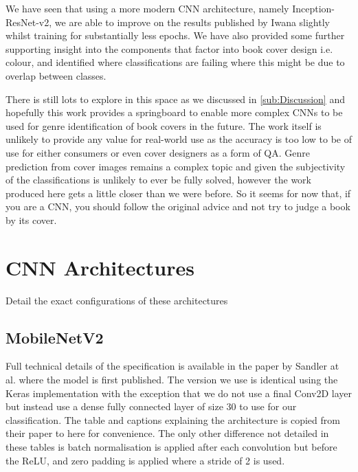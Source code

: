 \documentclass[12pt]{article}
\numberwithin{equation}{section}
\numberwithin{figure}{section}
\begin{document}
We have seen that using a more modern CNN architecture, namely Inception-ResNet-v2, we are able to improve on the results published by Iwana slightly whilst training for substantially less epochs. We have also provided some further supporting insight into the components that factor into book cover design i.e. colour, and identified where classifications are failing where this might be due to overlap between classes.

There is still lots to explore in this space as we discussed in \cref{sub:Discussion} and hopefully this work provides a springboard to enable more complex CNNs to be used for genre identification of book covers in the future. The work itself is unlikely to provide any value for real-world use as the accuracy is too low to be of use for either consumers or even cover designers as a form of QA. Genre prediction from cover images remains a complex topic and given the subjectivity of the classifications is unlikely to ever be fully solved, however the work produced here gets a little closer than we were before. So it seems for now that, if you are a CNN, you should follow the original advice and not try to judge a book by its cover.


 

\appendix

\section{CNN Architectures} 
\label{sec:CNN_Architectures} 
Detail the exact configurations of these architectures
\subsection{MobileNetV2} 
\label{sub:MobileNetV2} 
Full technical details of the specification is available in the paper by Sandler at al. \cite{Sandler2018} where the model is first published. The version we use is identical using the Keras implementation with the exception that we do not use a final Conv2D layer but instead use a dense fully connected layer of size 30 to use for our classification. The table and captions explaining the architecture is copied from their paper to here for convenience. The only other difference not detailed in these tables is batch normalisation is applied after each convolution but before the ReLU, and zero padding is applied where a stride of 2 is used. 
\end{document}
